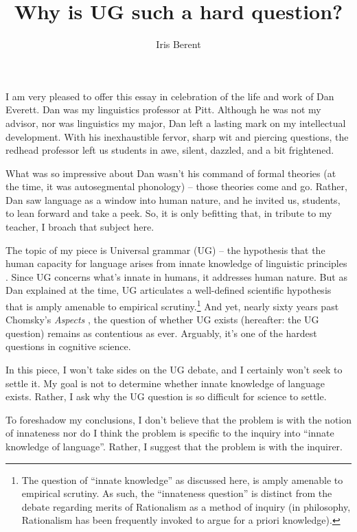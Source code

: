 \documentclass[output=paper,colorlinks,citecolor=brown
]{langscibook}
\author{Iris Berent\orcid{0000-0003-2820-9693}\affiliation{Northeastern University}}
\title{Why is UG such a hard question?}
\begin{document}
\maketitle

\noindent I am very pleased to offer this essay in celebration of the life and work of Dan Everett. Dan was my linguistics professor at Pitt. Although he was not my advisor, nor was linguistics my major, Dan left a lasting mark on my intellectual development. With his inexhaustible fervor, sharp wit and piercing questions, the redhead professor left us students in awe, silent, dazzled, and a bit frightened. 

What was so impressive about Dan wasn’t his command of formal theories (at the time, it was autosegmental phonology) -- those theories come and go. Rather, Dan saw language as a window into human nature, and he invited us, students, to lean forward and take a peek. So, it is only befitting that, in tribute to my teacher, I broach that subject here.

The topic of my piece is Universal grammar (UG) --  the hypothesis that the human capacity for language arises from innate knowledge of linguistic principles \citep{chomsky1965aspects}. Since UG concerns what’s innate in humans, it addresses human nature.  But as Dan explained at the time, UG articulates a well-defined scientific hypothesis that is amply amenable to empirical scrutiny.\footnote{The question of ``innate knowledge'' as discussed here, is amply amenable to empirical scrutiny. As such, the ``innateness question'' is distinct from the debate regarding merits of Rationalism as a method of inquiry (in philosophy, Rationalism has been frequently invoked to argue for a priori knowledge).} And yet, nearly sixty years past Chomsky’s \textit{Aspects} \citep{chomsky1965aspects}, the question of whether UG exists (hereafter: the UG question) remains as contentious as ever.  Arguably, it’s one of the hardest questions in cognitive science.

In this piece, I won’t take sides on the UG debate, and I certainly won’t seek to settle it.  My goal is not to determine whether innate knowledge of language exists. Rather, I ask why the UG question is so difficult for science to settle.  

To foreshadow my conclusions, I don’t believe that the problem is with the notion of innateness nor do I think the problem is specific to the inquiry into ``innate knowledge of language''. Rather, I suggest that the problem is with the inquirer.  
\end{document}

